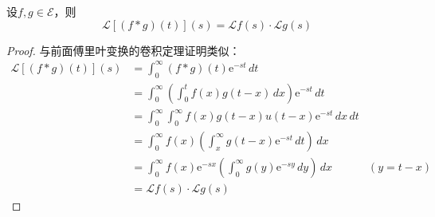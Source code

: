 \begin{theorem}[卷积定理]
    设$f,g\in\mathcal{E} $，则
    \[\mathcal{L} [(f*g)(t)](s)=\mathcal{L} f(s)\cdot \mathcal{L} g(s)\]
\end{theorem}
\begin{proof}
与前面傅里叶变换的卷积定理证明类似：
    \begin{align*}
        \mathcal{L} [(f*g)(t)](s)&=\int_0^{\infty}(f*g)(t)\mathrm{e}^{-st}\,dt\\
        &=\int_0^{\infty}\left(\int_0^t f(x)g(t-x)\,dx\right)\mathrm{e}^{-st}\,dt\\
        &=\int_0^{\infty}\int_0^{\infty}f(x)g(t-x)u(t-x)\mathrm{e}^{-st}\,dx\,dt\\
        &=\int_0^{\infty}f(x)\left(\int_x^{\infty}g(t-x)\mathrm{e}^{-st}\,dt\right)\,dx\\
        &=\int_0^{\infty}f(x)\mathrm{e}^{-sx}\left(\int_0^{\infty}g(y)\mathrm{e}^{-sy}\,dy\right)\,dx&(y=t-x)\\
        &=\mathcal{L} f(s)\cdot \mathcal{L} g(s)
    \end{align*}
\end{proof}

